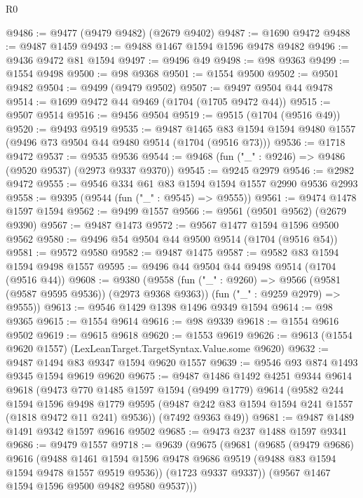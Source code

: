 \begin{lexlean}{R0}
\begin{coremodule}
@9486 := @9477 (@9479 @9482) (@2679 @9402)
@9487 := @1690 @9472
@9488 := @9487 @1459
@9493 := @9488 @1467 @1594 @1596 @9478 @9482
@9496 := @9436 @9472 @81 @1594
@9497 := @9496 @49
@9498 := @98 @9363
@9499 := @1554 @9498
@9500 := @98 @9368
@9501 := @1554 @9500
@9502 := @9501 @9482
@9504 := @9499 (@9479 @9502)
@9507 := @9497 @9504 @44 @9478
@9514 := @1699 @9472 @44 @9469 (@1704 (@1705 @9472 @44))
@9515 := @9507 @9514
@9516 := @9456 @9504
@9519 := @9515 (@1704 (@9516 @49))
@9520 := @9493 @9519
@9535 := @9487
    @1465
    @83
    @1594
    @1594
    @9480
    @1557
    (@9496 @73 @9504 @44 @9480 @9514 (@1704 (@9516 @73)))
@9536 := @1718 @9472
@9537 := @9535 @9536
@9544 := @9468 (fun ("_" : @9246) => @9486 (@9520 @9537) (@2973 @9337 @9370))
@9545 := @9245 @2979
@9546 := @2982 @9472
@9555 := @9546 @334 @61 @83 @1594 @1594 @1557 @2990 @9536 @2993
@9558 := @9395 (@9544 (fun ("_" : @9545) => @9555))
@9561 := @9474 @1478 @1597 @1594
@9562 := @9499 @1557
@9566 := @9561 (@9501 @9562) (@2679 @9390)
@9567 := @9487 @1473
@9572 := @9567 @1477 @1594 @1596 @9500 @9562
@9580 := @9496 @54 @9504 @44 @9500 @9514 (@1704 (@9516 @54))
@9581 := @9572 @9580
@9582 := @9487 @1475
@9587 := @9582 @83 @1594 @1594 @9498 @1557
@9595 := @9496 @44 @9504 @44 @9498 @9514 (@1704 (@9516 @44))
@9608 := @9380
    (@9558
      (fun ("_" : @9260) => @9566 (@9581 (@9587 @9595 @9536)) (@2973 @9368 @9363))
      (fun ("_" : @9259 @2979) => @9555))
@9613 := @9546 @1429 @1398 @1496 @9349 @1594
@9614 := @98 @9365
@9615 := @1554 @9614
@9616 := @98 @9339
@9618 := @1554 @9616 @9502
@9619 := @9615 @9618
@9620 := @1553 @9619
@9626 := @9613 (@1554 @9620 @1557) (LexLeanTarget.TargetSyntax.Value.some @9620)
@9632 := @9487 @1494 @83 @9347 @1594 @9620 @1557
@9639 := @9546 @93 @874 @1493 @9345 @1594 @9619 @9620
@9675 := @9487
    @1486
    @1492
    @4251
    @9344
    @9614
    @9618
    (@9473
      @770
      @1485
      @1597
      @1594
      (@9499 @1779)
      @9614
      (@9582
        @244
        @1594
        @1596
        @9498
        @1779
        @9595
        (@9487 @242 @83 @1594 @1594 @241 @1557 (@1818 @9472 @11 @241) @9536))
      (@7492 @9363 @49))
@9681 := @9487 @1489 @1491 @9342 @1597 @9616 @9502
@9685 := @9473 @237 @1488 @1597 @9341
@9686 := @9479 @1557
@9718 := @9639
    (@9675
      (@9681
        (@9685
          (@9479 @9686)
          @9616
          (@9488
            @1461
            @1594
            @1596
            @9478
            @9686
            @9519
            (@9488 @83 @1594 @1594 @9478 @1557 @9519 @9536))
          (@1723 @9337 @9337))
        (@9567 @1467 @1594 @1596 @9500 @9482 @9580 @9537)))

\end{coremodule}
\end{lexlean}
